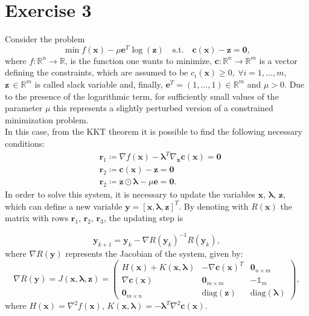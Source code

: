\documentclass[a4paper,11pt]{article}
\newcommand{\R}{\mathbb{R}}
\begin{document}
\section*{Exercise 3}
Consider the problem
\begin{equation}
	\min f(\textbf{x}) - \mu \textbf{e}^{T}\log(\textbf{z}) \quad \text{s.t.} \quad \textbf{c}(\textbf{x})- \textbf{z} = \textbf{0},
	\label{eq:pert_min_prob}
\end{equation}
where $f : \R^{n} \rightarrow \R$, is the function one wants to minimize, $\textbf{c} : \R^{n} \rightarrow \R^{m}$ is a vector defining the constraints, which are assumed to be $c_{i}(\textbf{x})\ge0, \ \forall i=1,\dots,m$, $\textbf{z}\, \in \R^{m}$ is called slack variable and, finally, $\textbf{e}^{T}=(1,\dots,1)\in \R^{m}$ and $\mu>0$. Due to the presence of the logarithmic term, for sufficiently small values of the parameter $\mu$ this represents a slightly perturbed version of a constrained minimization problem.\\

\noindent In this case, from the KKT theorem it is possible to find the following necessary conditions:
\begin{align}
	& \textbf{r}_{1} \coloneqq \nabla f(\textbf{x}) - \boldsymbol{\lambda}^{T}\nabla_{\textbf{x}}\textbf{c}(\textbf{x}) = \textbf{0} \\
	& \textbf{r}_{2} \coloneqq \textbf{c}(\textbf{x}) - \textbf{z} = \textbf{0} \\
	& \textbf{r}_{2} \coloneqq \textbf{z} \odot  \boldsymbol{\lambda} - \mu \textbf{e} = \textbf{0}.
\end{align}
In order to solve this system, it is necessary to update the variables $\textbf{x}$, $\boldsymbol{\lambda}$, $\textbf{z}$, which can define a new variable $\textbf{y} = [\textbf{x}, \boldsymbol{\lambda}, \textbf{z}]^{T}$. By denoting with $R(\textbf{x})$ the matrix with rows $\textbf{r}_{1}$, $\textbf{r}_{2}$, $\textbf{r}_{3}$, the updating step is

\begin{equation}
	\textbf{y}_{k+1} = \textbf{y}_{k} - \nabla R(\textbf{y}_{k})^{-1} R(\textbf{y}_{k}),
\end{equation}
where $\nabla R(\textbf{y})$ represents the Jacobian of the system, given by:
\begin{equation}
	\nabla R(\textbf{y}) = J(\textbf{x}, \boldsymbol{\lambda},\textbf{z}) =  
	\begin{pmatrix}
		H(\textbf{x}) + K(\textbf{x}, \boldsymbol{\lambda}) & -\nabla\textbf{c}(\textbf{x})^{T} & \textbf{0}_{n\times m}\\
		\nabla\textbf{c}(\textbf{x}) & \textbf{0}_{m\times m} & -\mathbb{1}_{m}\\
		\textbf{0}_{m\times n} & \text{diag}(\textbf{z}) & \text{diag}(\boldsymbol{\lambda})
	\end{pmatrix},
\end{equation}
where $H(\textbf{x}) = \nabla^{2}f(\textbf{x})$, $K(\textbf{x},\boldsymbol{\lambda})=-\boldsymbol{\lambda}^{T}\nabla^{2}\textbf{c}(\textbf{x})$.\\
\end{document}
